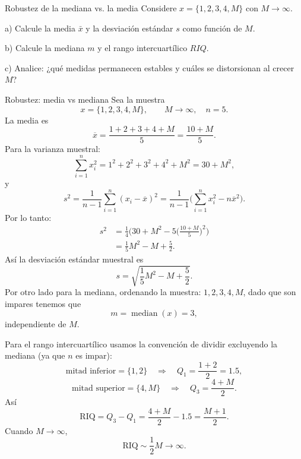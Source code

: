 \documentclass[a4paper,11pt]{article}
\begin{document}
\newpage
\begin{ejercicio}{10}
    Robustez de la mediana vs. la media
    Considere $x = \{1, 2, 3, 4, M\}$ con $M \rightarrow \infty$.

    a) Calcule la media $\bar{x}$ y la desviación estándar $s$ como función de $M$.

    b) Calcule la mediana $m$ y el rango intercuartílico $RIQ$.

    c) Analice: ¿qué medidas permanecen estables y cuáles se distorsionan al crecer $M$?
\end{ejercicio}
\begin{demostracion}{Robustez: media vs mediana}
    Sea la muestra
    \[
        x=\{1,2,3,4,M\},\qquad M\to\infty,\quad n=5.
    \]
    La media es
    \[
        \overline{x}=\frac{1+2+3+4+M}{5}=\frac{10+M}{5}.
    \]
    Para la varianza muestral:
    \[
        \sum_{i=1}^n x_i^2 = 1^2+2^2+3^2+4^2+M^2 = 30 + M^2,
    \]
    y
    \[
        s^2 = \frac{1}{n-1}\sum_{i=1}^n (x_i-\overline{x})^2
        = \frac{1}{n-1}\Big( \sum_{i=1}^n x_i^2 - n\overline{x}^2\Big).
    \]
    Por lo tanto:
    \[
        \begin{aligned}
            s^2
             & = \frac{1}{4}\Big(30+M^2 - 5\Big(\frac{10+M}{5}\Big)^2\Big) \\
             & =\frac{1}{5}M^2 - M + \frac{5}{2}.
        \end{aligned}
    \]
    Así la desviación estándar muestral es
    \[
        s=\sqrt{\frac{1}{5}M^2 - M + \frac{5}{2}}.
    \]
    Por otro lado para la mediana, ordenando la muestra: \(1,2,3,4,M\), dado que son impares tenemos que
    \[
        m=\operatorname{median}(x)=3,
    \]
    independiente de \(M\).

    Para el rango intercuartílico usamos la convención de dividir excluyendo la mediana (ya que \(n\) es impar):
    \[
        \text{mitad inferior}=\{1,2\}\quad\Rightarrow\quad Q_1=\frac{1+2}{2}=1.5,
    \]
    \[
        \text{mitad superior}=\{4,M\}\quad\Rightarrow\quad Q_3=\frac{4+M}{2}.
    \]
    Así
    \[
        \mathrm{RIQ}=Q_3-Q_1=\frac{4+M}{2}-1.5=\frac{M+1}{2}.
    \]
    Cuando \(M\to\infty\),
    \[
        \mathrm{RIQ}\sim \frac{1}{2}M \to \infty.
    \]



\end{demostracion}
\end{document}
